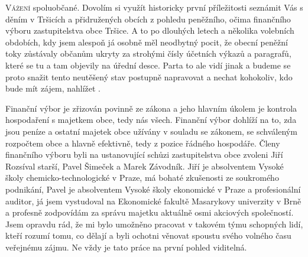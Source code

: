 \documentclass[10pt]{article}
\begin{document}
\closearticle

\begin{multicols}{2}{

\lettrine{V}{ážení} spoluobčané. Dovolím si využít historicky první příležitosti seznámit Vás s děním v Tršicích a  přidružených obcích z pohledu peněžního, očima finančního výboru zastupitelstva obce Tršice. A to po dlouhých letech a několika volebních obdobích, kdy jsem alespoň já osobně měl neodbytný pocit, že obecní peněžní toky zůstávaly občanům ukryty za strohými čísly účetních výkazů a paragrafů, které se tu a tam objevily na úřední desce. Parta  to ale vidí jinak a budeme se proto snažit tento neutěšený stav postupně napravovat a nechat kohokoliv, kdo bude mít zájem, nahlížet .

Finanční výbor je zřizován povinně ze zákona a jeho hlavním úkolem je kontrola hospodaření s majetkem obce, tedy nás všech. Finanční výbor dohlíží na to, zda jsou peníze a ostatní majetek obce užívány v souladu se zákonem, se schváleným rozpočtem obce a hlavně efektivně, tedy z pozice řádného hospodáře. Členy finančního výboru byli na ustanovující schůzi zastupitelstva obce zvoleni Jiří Rozsíval starší, Pavel Šimeček a Marek Závodník. Jiří je absolventem Vysoké školy chemicko-technologické v Praze, má bohaté zkušenosti ze soukromého podnikání, Pavel je absolventem Vysoké školy ekonomické v Praze a profesionální auditor, já jsem vystudoval na Ekonomické fakultě Masarykovy univerzity v Brně a profesně zodpovídám za správu majetku aktuálně osmi akciových společností. Jsem opravdu rád, že mi bylo umožněno pracovat v takovém týmu schopných lidí, kteří rozumí tomu, co dělají a byli ochotni věnovat spoustu svého volného času veřejnému zájmu. Ne vždy je tato práce na první pohled viditelná.

}
\end{multicols}
\end{document}
